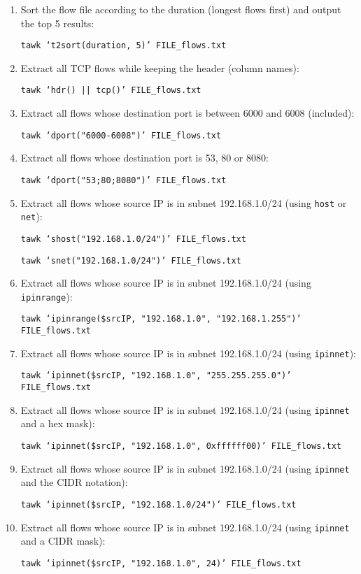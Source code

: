 \documentclass[documentation]{subfiles}
\begin{document}
\begin{enumerate}
    \item Sort the flow file according to the duration (longest flows first) and output the top 5 results:
        \begin{center}{\tt tawk `t2sort(duration, 5)' FILE\_flows.txt}\end{center}
    \item Extract all TCP flows while keeping the header (column names):
        \begin{center}{\tt tawk `hdr() || tcp()' FILE\_flows.txt}\end{center}
    \item Extract all flows whose destination port is between 6000 and 6008 (included):
        \begin{center}{\tt tawk `dport("6000-6008")' FILE\_flows.txt}\end{center}
    \item Extract all flows whose destination port is 53, 80 or 8080:
        \begin{center}{\tt tawk `dport("53;80;8080")' FILE\_flows.txt}\end{center}
    \item Extract all flows whose source IP is in subnet 192.168.1.0/24 (using {\tt host} or {\tt net}):
        \begin{center}{\tt tawk `shost("192.168.1.0/24")' FILE\_flows.txt}\end{center}
        \begin{center}{\tt tawk `snet("192.168.1.0/24")' FILE\_flows.txt}\end{center}
    \item Extract all flows whose source IP is in subnet 192.168.1.0/24 (using {\tt ipinrange}):
        \begin{center}{\tt tawk `ipinrange(\$srcIP, "192.168.1.0", "192.168.1.255")' FILE\_flows.txt}\end{center}
    \item Extract all flows whose source IP is in subnet 192.168.1.0/24 (using {\tt ipinnet}):
        \begin{center}{\tt tawk `ipinnet(\$srcIP, "192.168.1.0", "255.255.255.0")' FILE\_flows.txt}\end{center}
    \item Extract all flows whose source IP is in subnet 192.168.1.0/24 (using {\tt ipinnet} and a hex mask):
        \begin{center}{\tt tawk `ipinnet(\$srcIP, "192.168.1.0", 0xffffff00)' FILE\_flows.txt}\end{center}
    \item Extract all flows whose source IP is in subnet 192.168.1.0/24 (using {\tt ipinnet} and the CIDR notation):
        \begin{center}{\tt tawk `ipinnet(\$srcIP, "192.168.1.0/24")' FILE\_flows.txt}\end{center}
    \item Extract all flows whose source IP is in subnet 192.168.1.0/24 (using {\tt ipinnet} and a CIDR mask):
        \begin{center}{\tt tawk `ipinnet(\$srcIP, "192.168.1.0", 24)' FILE\_flows.txt}\end{center}
\end{enumerate}
\end{document}
